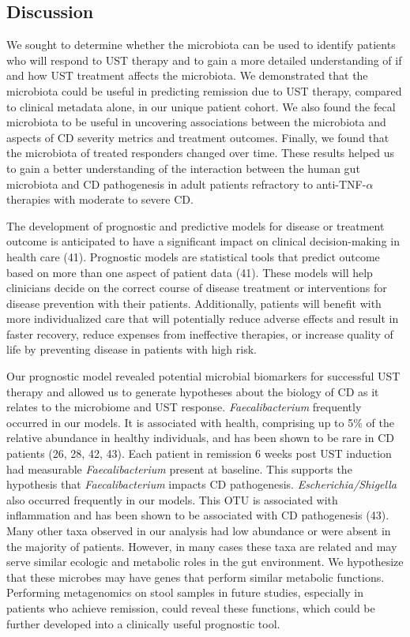 \documentclass[12pt,]{article}
\begin{document}
\subsection{Discussion}\label{discussion}

We sought to determine whether the microbiota can be used to identify
patients who will respond to UST therapy and to gain a more detailed
understanding of if and how UST treatment affects the microbiota. We
demonstrated that the microbiota could be useful in predicting remission
due to UST therapy, compared to clinical metadata alone, in our unique
patient cohort. We also found the fecal microbiota to be useful in
uncovering associations between the microbiota and aspects of CD
severity metrics and treatment outcomes. Finally, we found that the
microbiota of treated responders changed over time. These results helped
us to gain a better understanding of the interaction between the human
gut microbiota and CD pathogenesis in adult patients refractory to
anti-TNF-\({\alpha}\) therapies with moderate to severe CD.

The development of prognostic and predictive models for disease or
treatment outcome is anticipated to have a significant impact on
clinical decision-making in health care (41). Prognostic models are
statistical tools that predict outcome based on more than one aspect of
patient data (41). These models will help clinicians decide on the
correct course of disease treatment or interventions for disease
prevention with their patients. Additionally, patients will benefit with
more individualized care that will potentially reduce adverse effects
and result in faster recovery, reduce expenses from ineffective
therapies, or increase quality of life by preventing disease in patients
with high risk.

Our prognostic model revealed potential microbial biomarkers for
successful UST therapy and allowed us to generate hypotheses about the
biology of CD as it relates to the microbiome and UST response.
\emph{Faecalibacterium} frequently occurred in our models. It is
associated with health, comprising up to 5\% of the relative abundance
in healthy individuals, and has been shown to be rare in CD patients
(26, 28, 42, 43). Each patient in remission 6 weeks post UST induction
had measurable \emph{Faecalibacterium} present at baseline. This
supports the hypothesis that \emph{Faecalibacterium} impacts CD
pathogenesis. \emph{Escherichia/Shigella} also occurred frequently in
our models. This OTU is associated with inflammation and has been shown
to be associated with CD pathogenesis (43). Many other taxa observed in
our analysis had low abundance or were absent in the majority of
patients. However, in many cases these taxa are related and may serve
similar ecologic and metabolic roles in the gut environment. We
hypothesize that these microbes may have genes that perform similar
metabolic functions. Performing metagenomics on stool samples in future
studies, especially in patients who achieve remission, could reveal
these functions, which could be further developed into a clinically
useful prognostic tool.
\end{document}

